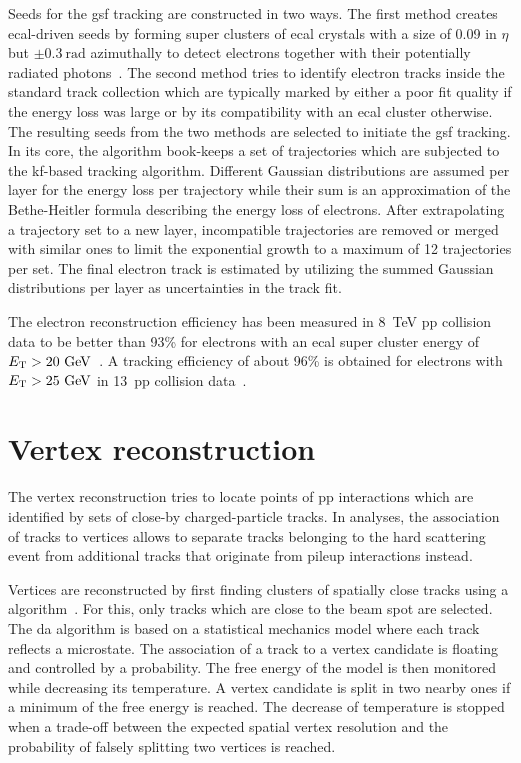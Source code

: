Seeds for the \gls{gsf} tracking are constructed in two ways. The first method creates \gls{ecal}-driven seeds by forming super clusters of \gls{ecal} crystals with a size of 0.09 in $\eta$ but $\pm0.3~\mathrm{rad}$ azimuthally to detect electrons together with their potentially radiated photons~\cite{CMS:2010aua}. The second method tries to identify electron tracks inside the standard track collection which are typically marked by either a poor fit quality if the energy loss was large or by its compatibility with an \gls{ecal} cluster otherwise. The resulting seeds from the two methods are selected to initiate the \gls{gsf} tracking. In its core, the algorithm book-keeps a set of trajectories which are subjected to the \gls{kf}-based tracking algorithm. Different Gaussian distributions are assumed per layer for the energy loss per trajectory while their sum is an approximation of the Bethe-Heitler formula describing the energy loss of electrons. After extrapolating a trajectory set to a new layer, incompatible trajectories are removed or merged with similar ones to limit the exponential growth to a maximum of 12 trajectories per set. The final electron track is estimated by utilizing the summed Gaussian distributions per layer as uncertainties in the track fit. 

The electron reconstruction efficiency has been measured in 8~TeV \gls{pp} collision data to be better than 93\% for electrons with an \gls{ecal} super cluster energy of $E_\mathrm{T}>20~\textrm{GeV}$~\cite{Khachatryan:2015hwa}. A tracking efficiency of about 96\% is obtained for electrons with $E_\mathrm{T}>25~\textrm{GeV}$ in 13~\TeV \gls{pp} collision data~\cite{CMS-DP-2017-004}.



\section{Vertex reconstruction}


The vertex reconstruction tries to locate points of \gls{pp} interactions which are identified by sets of close-by charged-particle tracks. In analyses, the association of tracks to vertices allows to separate tracks belonging to the hard scattering event from additional tracks that originate from pileup interactions instead.

Vertices are reconstructed by first finding clusters of spatially close tracks using a  algorithm~\cite{726788}. For this, only tracks which are close to the beam spot are selected. The \gls{da} algorithm is based on a statistical mechanics model where each track reflects a microstate. The association of a track to a vertex candidate is floating and controlled by a probability. The free energy of the model is then monitored while decreasing its temperature. A vertex candidate is split in two nearby ones if a minimum of the free energy is reached. The decrease of temperature is stopped when a trade-off between the expected spatial vertex resolution and the probability of falsely splitting two vertices is reached.

